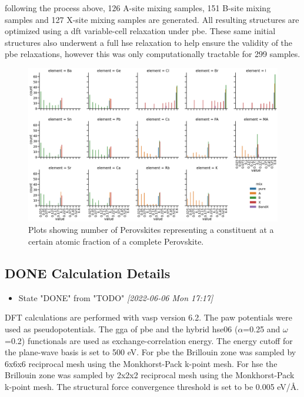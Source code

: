 \documentclass[twoside, twocolumn, 9pt, draft]{article}
\begin{document}
following the process above, 126 A-site mixing samples, 151 B-site
mixing samples and 127 X-site mixing samples are generated. All
resulting structures are optimized using a \acrshort{dft} variable-cell
relaxation under \acrfull{pbe}. These same initial structures also underwent a
full \acrfull{hse} relaxation to help ensure the validity of the \acrshort{pbe}
relaxations, however this was only computationally tractable for 299
samples.

\begin{figure}
\centering
\includegraphics[width=.9\linewidth]{variability_of_composition_vectors.png}
\caption{\label{fig:chemspace_uni} Plots showing number of Perovskites representing a constituent at a certain atomic fraction of a complete Perovskite.}
\end{figure}

\subsection*{{\bfseries\sffamily DONE} Calculation Details}
\label{sec:org9d448d0}
\begin{itemize}
\item State "DONE"       from "TODO"       \textit{[2022-06-06 Mon 17:17]}
\end{itemize}
DFT calculations are performed with \gls{vasp} version 6.2. The \acrlong{paw} potentials were used as pseudopotentials. The
\acrlong{gga} of \acrshort{pbe} and the hybrid \acrshort{hse}06
(\(\alpha\)=0.25 and \(\omega\)=0.2) functionals are used as
exchange-correlation energy. The energy cutoff for the plane-wave
basis is set to 500 eV. For \acrshort{pbe} the Brillouin zone was sampled by
6x6x6 reciprocal mesh using the Monkhorst-Pack k-point mesh. For \acrshort{hse}
the Brillouin zone was sampled by 2x2x2 reciprocal mesh using the
Monkhorst-Pack k-point mesh. The structural force convergence
threshold is set to be 0.005 eV/\AA{}.
\end{document}
